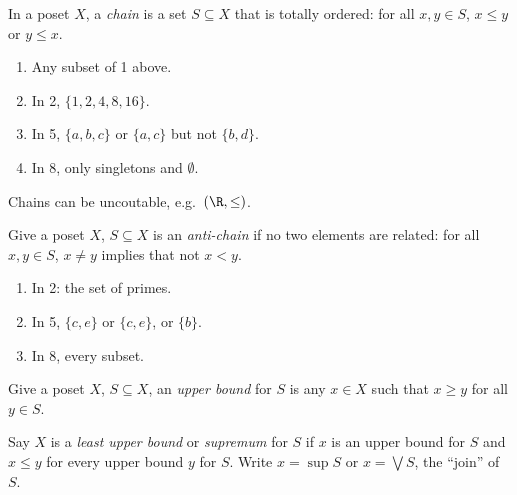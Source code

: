\documentclass[a4paper]{article}
\begin{document}
\begin{definition}[Chain]
  In a poset \(X\), a \emph{chain} is a set \(S \subseteq X\) that is totally ordered: for all \(x, y \in S\), \(x \leq y\) or \(y \leq x\).
\end{definition}

\begin{eg}\leavevmode
  \begin{enumerate}
  \item Any subset of 1 above.
  \item In 2, \(\{1, 2, 4, 8, 16\}\).
  \item In 5, \(\{a, b, c\}\) or \(\{a, c\}\) but not \(\{b, d\}\).
  \item In 8, only singletons and \(\emptyset\).
  \end{enumerate}
\end{eg}

\begin{note}
  Chains can be uncoutable, e.g.\ \((\R, \leq)\).
\end{note}

\begin{definition}
  Give a poset \(X\), \(S \subseteq X\) is an \emph{anti-chain} if no two elements are related: for all \(x, y \in S\), \(x \neq y\) implies that not \(x < y\).
\end{definition}

\begin{eg}\leavevmode
  \begin{enumerate}
  \item In 2: the set of primes.
  \item In 5, \(\{c, e\}\) or \(\{c, e\}\), or \(\{b\}\).
  \item In 8, every subset.
  \end{enumerate}
\end{eg}

\begin{definition}
  Give a poset \(X\), \(S \subseteq X\), an \emph{upper bound} for \(S\) is any \(x \in X\) such that \(x \geq y\) for all \(y \in S\).
\end{definition}

\begin{definition}
  Say \(X\) is a \emph{least upper bound} or \emph{supremum} for \(S\) if \(x\) is an upper bound for \(S\) and \(x \leq y\) for every upper bound \(y\) for \(S\). Write \(x = \sup S\) or \(x = \bigvee S\), the ``join'' of \(S\).
\end{definition}
\end{document}
